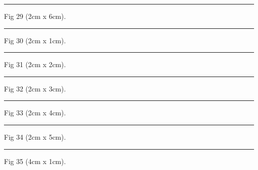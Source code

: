 \documentclass[a4paper,11pt]{article}
\begin{document}
\begin{swarmwrap}%
  \begin{minipage}[t]{2cm}
    \centering
    \rule{\linewidth}{6cm}
    {\footnotesize Fig 29 (2cm x 6cm).}
  \end{minipage}%
\end{swarmwrap}%
\swarmwrapnext
\lipsum[29]%

\begin{swarmwrap}%
  \begin{minipage}[t]{2cm}
    \centering
    \rule{\linewidth}{1cm}
    {\footnotesize Fig 30 (2cm x 1cm).}
  \end{minipage}%
\end{swarmwrap}%
\swarmwrapnext
\lipsum[30]%

\begin{swarmwrap}%
  \begin{minipage}[t]{2cm}
    \centering
    \rule{\linewidth}{2cm}
    {\footnotesize Fig 31 (2cm x 2cm).}
  \end{minipage}%
\end{swarmwrap}%
\swarmwrapnext
\lipsum[31]%

\begin{swarmwrap}%
  \begin{minipage}[t]{2cm}
    \centering
    \rule{\linewidth}{3cm}
    {\footnotesize Fig 32 (2cm x 3cm).}
  \end{minipage}%
\end{swarmwrap}%
\swarmwrapnext
\lipsum[32]%

\begin{swarmwrap}%
  \begin{minipage}[t]{2cm}
    \centering
    \rule{\linewidth}{4cm}
    {\footnotesize Fig 33 (2cm x 4cm).}
  \end{minipage}%
\end{swarmwrap}%
\swarmwrapnext
\lipsum[33]%

\begin{swarmwrap}%
  \begin{minipage}[t]{2cm}
    \centering
    \rule{\linewidth}{5cm}
    {\footnotesize Fig 34 (2cm x 5cm).}
  \end{minipage}%
\end{swarmwrap}%
\swarmwrapnext
\lipsum[34]%

\begin{swarmwrap}%
  \begin{minipage}[t]{4cm}
    \centering
    \rule{\linewidth}{1cm}
    {\footnotesize Fig 35 (4cm x 1cm).}
  \end{minipage}%
\end{swarmwrap}%
\swarmwrapnext
\lipsum[35]%
\end{document}
